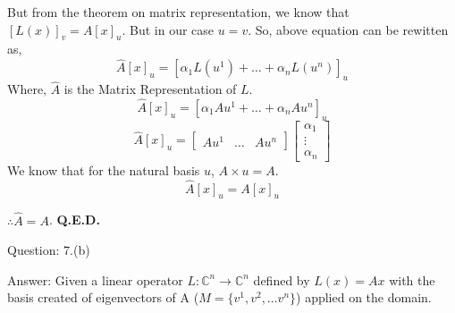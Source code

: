\documentclass[a4paper]{article}
\begin{document}
\begin{qalist}
			But from the theorem on matrix representation, we know that ${[L(x)]}_{v} = A{[x]}_{u}$. But in our case $u = v$. So, above equation can be rewitten as, 
			\begin{equation}
				\hat{A}{[x]}_{u} = {[{\alpha}_{1}L({u}^{1}) + \ldots + {\alpha}_{n}L({u}^{n})]}_{u}
			\end{equation}
			Where, $\hat{A}$ is the Matrix Representation of $L$.
			\begin{equation}
				\hat{A}{[x]}_{u} = {[{\alpha}_{1}A{u}^{1} + \ldots + {\alpha}_{n}A{u}^{n}]}_{u}
			\end{equation}
			\begin{equation}
				\hat{A}{[x]}_{u} = 
					\begin{bmatrix}A{u}^{1} & \ldots & A{u}^{n}\end{bmatrix}
					\begin{bmatrix}{\alpha}_{1} \\ \vdots \\ {\alpha}_{n}\end{bmatrix}
			\end{equation}
			We know that for the natural basis $u$, %
			$A \times u = A$.
			\begin{equation}
				\hat{A}{[x]}_{u} = A {[x]}_{u}
			\end{equation}

			$\therefore \hat{A} = A$. \textbf{Q.E.D.}
			
		
		\item[Question: 7.(b)] \setcounter{equation}{0}  %
		\item[Answer:] Given a linear operator $L  : {\mathbb{C}}^{n} \rightarrow {\mathbb{C}}^{n}$ defined by $L(x) = Ax$ with the basis created of eigenvectors of A ($M = \{ {v}^{1}, {v}^{2}, \ldots {v}^{n}\}$) applied on the domain.


\end{qalist}
\end{document}
